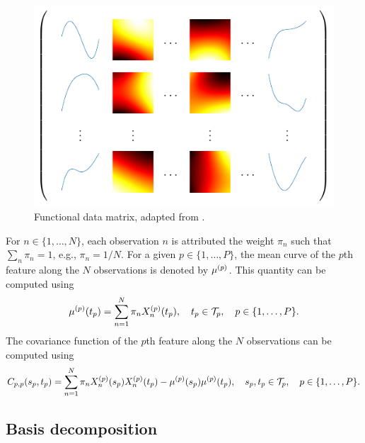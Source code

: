 \begin{figure}
    \centering
    \includegraphics[]{figures/data_matrix.pdf}
    \caption{Functional data matrix, adapted from \cite{berrenderoPrincipalComponentsMultivariate2011}.}
    \label{fig:data_matrix}
\end{figure}

For $n \in \{1, \dots, N\}$, each observation $n$ is attributed the weight $\pi_n$ such that $\sum_n \pi_n = 1$, e.g., $\pi_n = 1/N$.
For a given $p \in \{1, \dots, P\}$, the mean curve of the $p$th feature along the $N$ observations is denoted by $\mu^{(p)}$. This quantity can be computed using 
\begin{equation*}\label{eq:mu_estimation}
    \mu^{(p)}(t_p) = \sum_{n = 1}^N \pi_nX_n^{(p)}(t_p), \quad t_p \in \mathcal{T}_{p}, \quad p \in \{1, \dots, P\}.
\end{equation*}
The covariance function of the $p$th feature along the $N$ observations can be computed using
\begin{equation}\label{eq:cov_estimation}
    C_{p, p}(s_p, t_p) = \sum_{n = 1}^N \pi_nX_n^{(p)}(s_p)X_n^{(p)}(t_p) - \mu^{(p)}(s_p)\mu^{(p)}(t_p), \quad s_p, t_p \in \mathcal{T}_{p}, \quad p \in \{1, \dots, P\}.
\end{equation}

\subsection{Basis decomposition} %
\label{sub:basis_decomposition}

